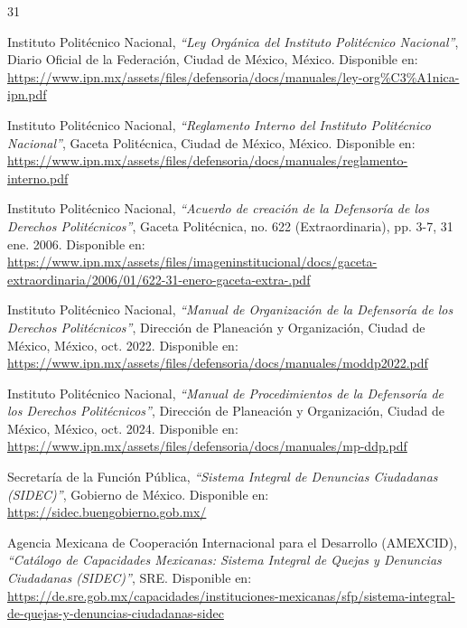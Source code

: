 
\begin{thebibliography}{31}


Instituto Politécnico Nacional, \textit{``Ley Orgánica del Instituto Politécnico Nacional''}, Diario Oficial de la Federación, Ciudad de México, México. Disponible en: \url{https://www.ipn.mx/assets/files/defensoria/docs/manuales/ley-org\%C3\%A1nica-ipn.pdf}

Instituto Politécnico Nacional, \textit{``Reglamento Interno del Instituto Politécnico Nacional''}, Gaceta Politécnica, Ciudad de México, México. Disponible en: \url{https://www.ipn.mx/assets/files/defensoria/docs/manuales/reglamento-interno.pdf}

Instituto Politécnico Nacional, \textit{``Acuerdo de creación de la Defensoría de los Derechos Politécnicos''}, Gaceta Politécnica, no. 622 (Extraordinaria), pp. 3-7, 31 ene. 2006. Disponible en: \url{https://www.ipn.mx/assets/files/imageninstitucional/docs/gaceta-extraordinaria/2006/01/622-31-enero-gaceta-extra-.pdf}

Instituto Politécnico Nacional, \textit{``Manual de Organización de la Defensoría de los Derechos Politécnicos''}, Dirección de Planeación y Organización, Ciudad de México, México, oct. 2022. Disponible en: \url{https://www.ipn.mx/assets/files/defensoria/docs/manuales/moddp2022.pdf}

Instituto Politécnico Nacional, \textit{``Manual de Procedimientos de la Defensoría de los Derechos Politécnicos''}, Dirección de Planeación y Organización, Ciudad de México, México, oct. 2024. Disponible en: \url{https://www.ipn.mx/assets/files/defensoria/docs/manuales/mp-ddp.pdf}

Secretaría de la Función Pública, \textit{``Sistema Integral de Denuncias Ciudadanas (SIDEC)''}, Gobierno de México. Disponible en: \url{https://sidec.buengobierno.gob.mx/}

Agencia Mexicana de Cooperación Internacional para el Desarrollo (AMEXCID), \textit{``Catálogo de Capacidades Mexicanas: Sistema Integral de Quejas y Denuncias Ciudadanas (SIDEC)''}, SRE. Disponible en: \url{https://de.sre.gob.mx/capacidades/instituciones-mexicanas/sfp/sistema-integral-de-quejas-y-denuncias-ciudadanas-sidec}


\end{thebibliography}
